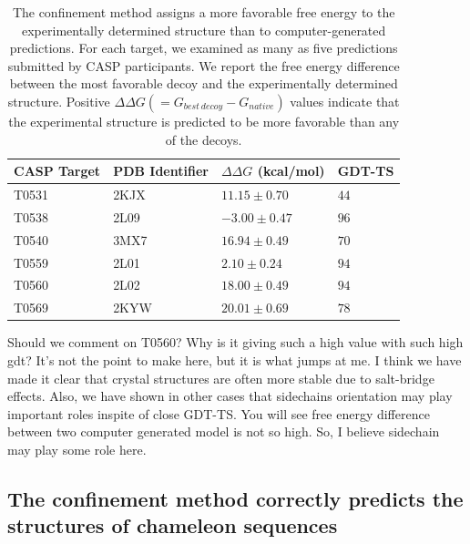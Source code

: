 \documentclass[12pt]{article}
\newcommand{\Alberto}[1]{\color{ForestGreen}#1\normalcolor }
\newcommand{\Arijit}[1]{\color{magenta}#1\normalcolor}
\begin{document}
\begin{table}
\begin{center}
\caption{The confinement method assigns a more favorable free energy to the experimentally determined structure than to
    computer-generated predictions. For each target, we examined as many as five predictions submitted by CASP
    participants. We report the free energy difference between the most favorable decoy and the experimentally
    determined structure. Positive $\Delta\Delta G (=G_{best~decoy} - G_{native})$ values indicate that the experimental structure is predicted to be
    more favorable than any of the decoys.}
\label{table:casp_control}
\begin{tabular}{l l l l}\hline
    CASP Target  & PDB Identifier & $\Delta \Delta G$ (kcal/mol) & GDT-TS \\ \hline
     T0531       &    2KJX        &          $11.15 \pm 0.70$    &  $44$ \\ \hline
     T0538       &    2L09        &          $-3.00 \pm 0.47$    &  $96$ \\ \hline
     T0540       &    3MX7        &          $16.94 \pm 0.49$    &  $70$ \\ \hline
     T0559       &    2L01        &          $2.10 \pm 0.24$     &  $94$ \\ \hline
     T0560       &    2L02        &          $18.00 \pm 0.49$    &  $94$ \\ \hline
     T0569       &    2KYW        &          $20.01 \pm 0.69$    &  $78$ \\ \hline
\end{tabular}
\end{center}
\end{table}
\Alberto{Should we comment on T0560? Why is it giving such a high value with such high gdt? It's not
the point to make here, but it is what jumps at me.}
\Arijit{I think we have made it clear that crystal structures are often more stable due to salt-bridge effects. Also, we have shown
in other cases that sidechains orientation may play important roles inspite of close GDT-TS. You will see free energy difference between 
two computer generated model is not so high. So, I believe sidechain may play some role here.}  


\subsection*{The confinement method correctly predicts the structures of chameleon sequences}
\end{document}

